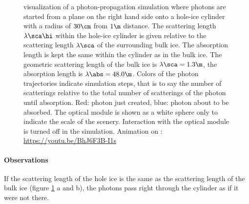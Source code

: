 \begin{figure}[htbp]
  \hfill
  \hfill
  \hfill
  \hfill
  \hfill
  \hfill
  \hfill
  \hfill
  \caption{\steamshovel visualization of a photon-propagation simulation where photons are started from a plane on the right hand side onto a hole-ice cylinder with a radius of $30\cm$ from $1\m$ distance. The scattering length $\lambda\sca\hi$ within the hole-ice cylinder is given relative to the scattering length $\lambda\sca$ of the surrounding bulk ice. The absorption length is kept the same within the cylinder as in the bulk ice. The geometric scattering length of the bulk ice is $\lambda\sca = 1.3\m$, the absorption length is $\lambda\abs = 48.0\m$. Colors of the photon trajectories indicate simulation steps, that is to say the number of scatterings relative to the total number of scatterings of the photon until absorption. Red: photon just created, blue: photon about to be absorbed. The optical module is shown as a white sphere only to indicate the scale of the scenery. Interaction with the optical module is turned off in the simulation. Animation on : \protect\url{https://youtu.be/BhJ6F3B-I1s}}
  \label{fig:Uo8kuo2z}
\end{figure}

\paragraph{Observations}
If the scattering length of the hole ice is the same as the scattering length of the bulk ice (figure \ref{fig:Uo8kuo2z} a and b), the photons pass right through the cylinder as if it were not there.

